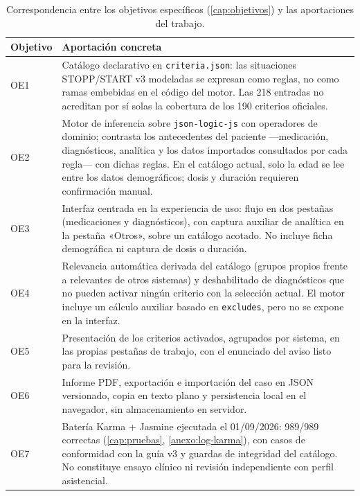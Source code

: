 \begin{table}[H]
  \centering
  \scriptsize
  \renewcommand{\arraystretch}{0.92}
  \begin{tabularx}{\textwidth}{@{}lX@{}}
    \toprule
    \textbf{Objetivo} & \textbf{Aportación concreta} \\
    \midrule
    OE1 &
      Catálogo declarativo en \texttt{criteria.json}: las situaciones
      STOPP/START v3 modeladas se expresan como reglas, no como ramas
      embebidas en el código del motor. Las 218 entradas no acreditan por
      sí solas la cobertura de los 190 criterios oficiales. \\
    OE2 &
      Motor de inferencia sobre \texttt{json-logic-js} con operadores
      de dominio; contrasta los antecedentes del paciente ---medicación,
      diagnósticos, analítica y los datos importados consultados por cada
      regla--- con dichas reglas. En el catálogo actual, solo la edad se
      lee entre los datos demográficos; dosis y duración requieren
      confirmación manual. \\
    OE3 &
      Interfaz centrada en la experiencia de uso: flujo en dos pestañas
      (medicaciones y diagnósticos), con captura auxiliar de analítica en
      la pestaña «Otros», sobre un catálogo acotado. No incluye ficha
      demográfica ni captura de dosis o duración. \\
    OE4 &
      Relevancia automática derivada del catálogo (grupos propios frente
      a relevantes de otros sistemas) y deshabilitado de diagnósticos que
      no pueden activar ningún criterio con la selección actual. El motor
      incluye un cálculo auxiliar basado en \texttt{excludes}, pero no se
      expone en la interfaz. \\
    OE5 &
      Presentación de los criterios activados, agrupados por sistema, en
      las propias pestañas de trabajo, con el enunciado del aviso listo
      para la revisión. \\
    OE6 &
      Informe PDF, exportación e importación del caso en JSON
      versionado, copia en texto plano y persistencia local en el
      navegador, sin almacenamiento en servidor. \\
    OE7 &
      Batería Karma + Jasmine ejecutada el 01/09/2026: 989/989 correctas
      (\cref{cap:pruebas}, \cref{anexo:log-karma}), con casos de
      conformidad con la guía v3 y guardas de integridad del catálogo. No
      constituye ensayo clínico ni revisión independiente con perfil
      asistencial. \\
    \bottomrule
  \end{tabularx}
  \caption{Correspondencia entre los objetivos específicos
    (\cref{cap:objetivos}) y las aportaciones del trabajo.}
  \label{tab:objetivos-aportaciones}
\end{table}

